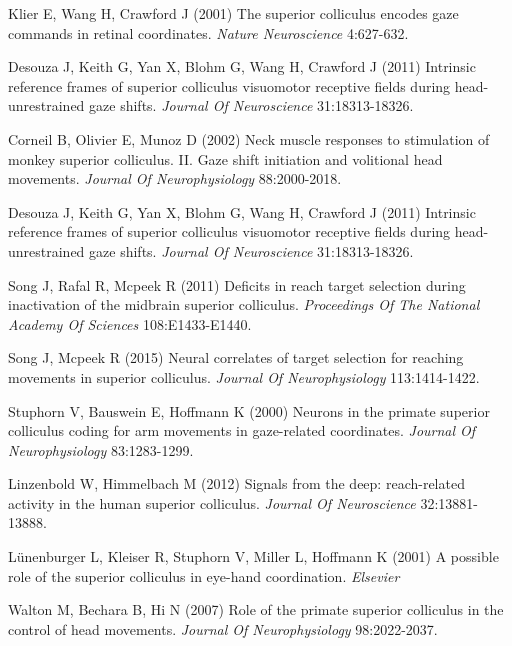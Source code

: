 \documentclass{ar-1col}
\begin{document}
{\begin{thebibliography}{00}
Klier E, Wang H, Crawford J (2001) 
The superior colliculus encodes gaze commands in retinal coordinates.
\textit{ Nature Neuroscience} 4:627-632.

Desouza J, Keith G, Yan X, Blohm G, Wang H, Crawford J (2011) 
Intrinsic reference frames of superior colliculus visuomotor receptive fields during head-unrestrained gaze shifts.
\textit{ Journal Of Neuroscience} 31:18313-18326.

Corneil B, Olivier E, Munoz D (2002) 
Neck muscle responses to stimulation of monkey superior colliculus. II. Gaze shift initiation and volitional head movements.
\textit{ Journal Of Neurophysiology} 88:2000-2018.

Desouza J, Keith G, Yan X, Blohm G, Wang H, Crawford J (2011) 
Intrinsic reference frames of superior colliculus visuomotor receptive fields during head-unrestrained gaze shifts.
\textit{ Journal Of Neuroscience} 31:18313-18326.

Song J, Rafal R, Mcpeek R (2011) 
Deficits in reach target selection during inactivation of the midbrain superior colliculus.
\textit{ Proceedings Of The National Academy Of Sciences} 108:E1433-E1440.

Song J, Mcpeek R (2015) 
Neural correlates of target selection for reaching movements in superior colliculus.
\textit{ Journal Of Neurophysiology} 113:1414-1422.

Stuphorn V, Bauswein E, Hoffmann K (2000) 
Neurons in the primate superior colliculus coding for arm movements in gaze-related coordinates.
\textit{ Journal Of Neurophysiology} 83:1283-1299.

Linzenbold W, Himmelbach M (2012) 
Signals from the deep: reach-related activity in the human superior colliculus.
\textit{ Journal Of Neuroscience} 32:13881-13888.

L{\"u}nenburger L, Kleiser R, Stuphorn V, Miller L, Hoffmann K (2001) 
A possible role of the superior colliculus in eye-hand coordination.
\textit{ Elsevier}

Walton M, Bechara B, Hi N (2007) 
Role of the primate superior colliculus in the control of head movements.
\textit{ Journal Of Neurophysiology} 98:2022-2037.


\end{thebibliography}}
\end{document}
